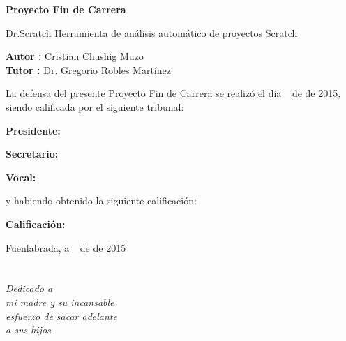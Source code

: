 \documentclass[a4paper, 12pt]{book}
\begin{document}
\vspace{-4cm}
\begin{center}
\LARGE
\textbf{Proyecto Fin de Carrera}

\vspace{1cm}
\large
Dr.Scratch Herramienta de análisis automático de proyectos Scratch

\vspace{1cm}
\large
\textbf{Autor :} Cristian Chushig Muzo \\
\textbf{Tutor :} Dr. Gregorio Robles Martínez

\end{center}

\vspace{1cm}
La defensa del presente Proyecto Fin de Carrera se realizó el día \qquad$\;\,$ de \qquad\qquad\qquad\qquad \newline de 2015, siendo calificada por el siguiente tribunal:


\vspace{0.5cm}
\textbf{Presidente:}

\vspace{1.2cm}
\textbf{Secretario:}

\vspace{1.2cm}
\textbf{Vocal:}


\vspace{1.2cm}
y habiendo obtenido la siguiente calificación:

\vspace{1cm}
\textbf{Calificación:}


\vspace{1cm}
\begin{flushright}
Fuenlabrada, a \qquad$\;\,$ de \qquad\qquad\qquad\qquad de 2015
\end{flushright}




\chapter*{}
\begin{flushright}
\textit{Dedicado a \\
mi madre y su incansable  \\
esfuerzo de sacar adelante \\
a sus hijos}
\end{flushright}
\end{document}
